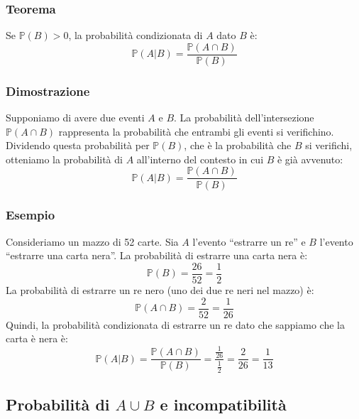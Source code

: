 \documentclass{article}
\begin{document}
\subsubsection{Teorema}
Se \(\mathbb{P}(B) > 0\), la probabilità condizionata di \(A\) dato \(B\) è:
\[
    \mathbb{P}(A|B) = \frac{\mathbb{P}(A \cap B)}{\mathbb{P}(B)}
\]

\subsubsection{Dimostrazione}
Supponiamo di avere due eventi \(A\) e \(B\). La probabilità dell'intersezione \(\mathbb{P}(A \cap B)\)
rappresenta la probabilità che entrambi gli eventi si verifichino. Dividendo questa probabilità
per \(\mathbb{P}(B)\), che è la probabilità che \(B\) si verifichi, otteniamo la probabilità di \(A\)
all'interno del contesto in cui \(B\) è già avvenuto:
\[
    \mathbb{P}(A|B) = \frac{\mathbb{P}(A \cap B)}{\mathbb{P}(B)}
\]

\subsubsection{Esempio}
Consideriamo un mazzo di 52 carte. Sia \(A\) l'evento ``estrarre un re'' e \(B\) l'evento
``estrarre una carta nera''. La probabilità di estrarre una carta nera è:
\[
    \mathbb{P}(B) = \frac{26}{52} = \frac{1}{2}
\]
La probabilità di estrarre un re nero (uno dei due re neri nel mazzo) è:
\[
    \mathbb{P}(A \cap B) = \frac{2}{52} = \frac{1}{26}
\]
Quindi, la probabilità condizionata di estrarre un re dato che sappiamo che la carta è nera è:
\[
    \mathbb{P}(A|B) = \frac{\mathbb{P}(A \cap B)}{\mathbb{P}(B)} =
    \frac{\frac{1}{26}}{\frac{1}{2}} = \frac{2}{26} = \frac{1}{13}
\]

\begin{center}
\end{center}

\newpage
\subsection{Probabilità di \(A \cup B\) e incompatibilità}
\end{document}
